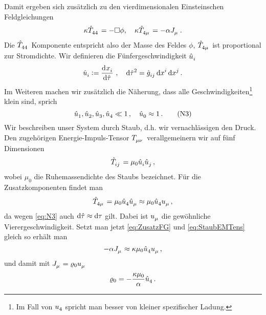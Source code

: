 Damit ergeben sich zusätzlich zu den vierdimensionalen Einsteinschen
Feldgleichungen
\begin{equation}
\kappa\tensor{\hat{T}}{_4_4}=-\square\phi, \quad
\kappa\tensor{\hat{T}}{_4_\mu}=-\alpha\tensor{J}{_\mu}\,.\label{eq:ZusatzFG}
\end{equation}
Die $\tensor{\hat{T}}{_4_4}$ Komponente entspricht also der Masse des Feldes
$\phi$, $\tensor{\hat{T}}{_4_\mu}$ ist proportional zur Stromdichte.
 Wir definieren die Fünfergeschwindigkeit $\tensor{\hat{u}}{_i}$
\begin{equation}
\tensor{\hat{u}}{_i}:=\dod{\tensor{x}{_i}}{\hat{\tau}}\,,
\quad\dif\hat{\tau}^2=\tensor{\hat{g}}{_i_j}\dif\tensor{x}{^i}\dif\tensor{x}{^j}\,.
\end{equation}
Im Weiteren machen wir zusätzlich die Näherung, dass alle
Geschwindigkeiten\footnote{Im Fall von $\tensor{u}{_4}$ spricht man
besser von kleiner spezifischer Ladung.} klein sind, sprich
\begin{equation}
\tensor{\hat{u}}{_1},\tensor{\hat{u}}{_2},\tensor{\hat{u}}{_3},\tensor{\hat{u}}{_4}\ll 1
\,,\quad\tensor{\hat{u}}{_0}\approx 1\, .\tag{N3}\label{eq:N3}
\end{equation}
Wir beschreiben unser System durch Staub, d.h. wir vernachlässigen den Druck. 
Den zugehörigen Energie-Impuls-Tensor $\tensor{T}{_\mu_\nu}$
verallgemeinern wir auf fünf Dimensionen
\begin{equation}
\tensor{\hat{T}}{_i_j}=\mu_0\tensor{\hat{u}}{_i}\tensor{\hat{u}}{_j}\, ,
\end{equation}
wobei $\mu_0$ die Ruhemassendichte des Staubs bezeichnet. Für die
Zusatzkomponenten findet man 
\begin{equation}
\tensor{\hat{T}}{_4_\mu}
=\mu_0\tensor{\hat{u}}{_4}\tensor{\hat{u}}{_\mu}\approx\mu_0\tensor{\hat{u}}{_4}\tensor{u}{_\mu}\,,
\label{eq:StaubEMTens}
\end{equation}
da wegen \eqref{eq:N3} auch $\dif\hat{\tau}\approx\dif\tau$ gilt.
Dabei ist $\tensor{u}{_\mu}$ die gewöhnliche Vierergeschwindigkeit.
Setzt man jetzt \eqref{eq:ZusatzFG} und \eqref{eq:StaubEMTens} gleich so erhält
man
\begin{equation}
-\alpha\tensor{J}{_\mu}\approx\kappa\mu_0\tensor{\hat{u}}{_4}\tensor{u}{_\mu}
\,,
\end{equation}
und damit mit $\tensor{J}{_\mu}=\varrho_0\tensor{u}{_\mu}$
\begin{equation}
\varrho_0=-\frac{\kappa\mu_0}{\alpha}\tensor{\hat{u}}{_4}\,.\label{eq:murhorel}
\end{equation}
